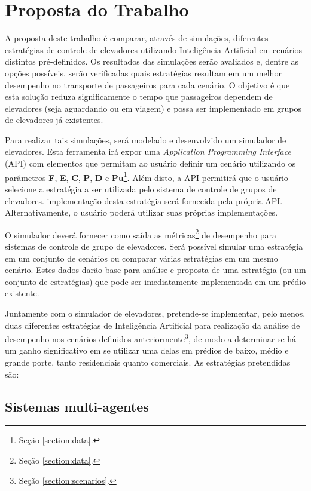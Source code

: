 \chapter{\label{chap:proposal}Proposta do Trabalho}

A proposta deste trabalho é comparar, através de simulações, diferentes
estratégias de controle de elevadores utilizando Inteligência Artificial em
cenários distintos pré-definidos. Os resultados das simulações serão avaliados
e, dentre as opções possíveis, serão verificadas quais estratégias resultam em
um melhor desempenho no transporte de passageiros para cada cenário. O objetivo
é que esta solução reduza significamente o tempo que passageiros dependem de
elevadores (seja aguardando ou em viagem) e possa ser implementado em grupos de
elevadores já existentes.

Para realizar tais simulações, será modelado e desenvolvido um simulador de
elevadores. Esta ferramenta irá expor uma \textit{Application Programming
Interface} (API) com elementos que permitam ao usuário definir um cenário
utilizando os parâmetros \textbf{F}, \textbf{E}, \textbf{C}, \textbf{P},
\textbf{D} e \textbf{Pu}\footnote{Seção \ref{section:data}.}. Além disto, a API
permitirá que o usuário selecione a estratégia a ser utilizada pelo sistema de
controle de grupos de elevadores. implementação desta estratégia será fornecida
pela própria API. Alternativamente, o usuário poderá utilizar suas próprias
implementações.

O simulador deverá fornecer como saída as métricas\footnote{Seção
\ref{section:data}.} de desempenho para sistemas de controle de grupo de
elevadores. Será possível simular uma estratégia em um conjunto de cenários ou
comparar várias estratégias em um mesmo cenário. Estes dados darão base para
análise e proposta de uma estratégia (ou um conjunto de estratégias) que pode
ser imediatamente implementada em um prédio existente.

Juntamente com o simulador de elevadores, pretende-se implementar, pelo menos,
duas diferentes estratégias de Inteligência Artificial para realização da
análise de desempenho nos cenários definidos anteriormente\footnote{Seção
\ref{section:scenarios}.}, de modo a determinar se há um ganho significativo em
se utilizar uma delas em prédios de baixo, médio e grande porte, tanto
residenciais quanto comerciais. As estratégias pretendidas são:

\section{\label{section:multiagentes}Sistemas multi-agentes}
